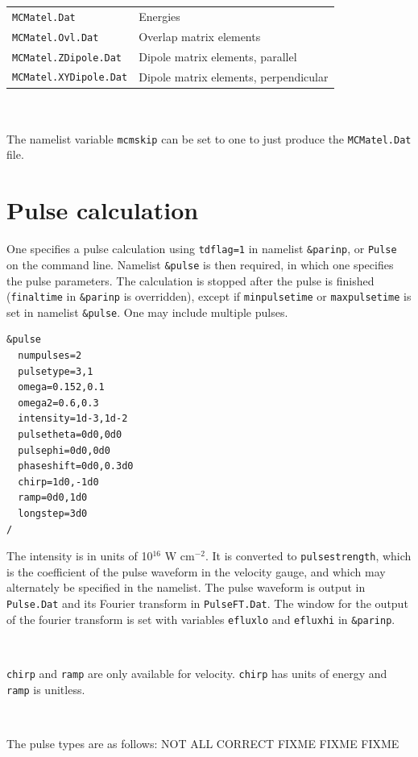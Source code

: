 \documentclass[10pt,leqno, oneside]{book}
\begin{document}
\begin{tabular}{ll}
\verb#MCMatel.Dat# & Energies \\
\verb#MCMatel.Ovl.Dat# & Overlap matrix elements \\
\verb#MCMatel.ZDipole.Dat# & Dipole matrix elements, parallel \\
\verb#MCMatel.XYDipole.Dat# & Dipole matrix elements, perpendicular \\
\end{tabular} \\ \\
%
The namelist variable \verb#mcmskip# can be set to one to just produce the \verb#MCMatel.Dat# file.


\section{Pulse calculation}

One specifies a pulse calculation using \verb#tdflag=1# in namelist \verb#&parinp#, or \verb#Pulse# on the 
command line.  Namelist \verb#&pulse# is then required, in which one specifies the pulse parameters.  
The calculation is stopped after the pulse is finished (\verb#finaltime# in \verb#&parinp# is overridden), except if 
\verb#minpulsetime# or \verb#maxpulsetime# is set in namelist \verb#&pulse#.
  One may include
multiple pulses.  

{\footnotesize
\begin{verbatim}
&pulse
  numpulses=2
  pulsetype=3,1
  omega=0.152,0.1
  omega2=0.6,0.3
  intensity=1d-3,1d-2
  pulsetheta=0d0,0d0
  pulsephi=0d0,0d0
  phaseshift=0d0,0.3d0
  chirp=1d0,-1d0
  ramp=0d0,1d0
  longstep=3d0
/
\end{verbatim}}

The intensity is in units of 10$^{16}$ W cm$^{-2}$.  It is converted to \verb#pulsestrength#, which is the coefficient of the pulse waveform in the velocity 
gauge, and which may alternately be specified in the namelist.  The pulse waveform is output in \verb#Pulse.Dat# and its Fourier transform 
in \verb#PulseFT.Dat#.  The window for the output of the fourier transform is set with variables \verb#efluxlo# and \verb#efluxhi# in \verb#&parinp#.

\

\verb#chirp# and \verb#ramp# are only available for velocity.  \verb#chirp# has units of energy and \verb#ramp# is unitless.

\

The pulse types are as follows:  NOT ALL CORRECT FIXME FIXME FIXME
\end{document}

